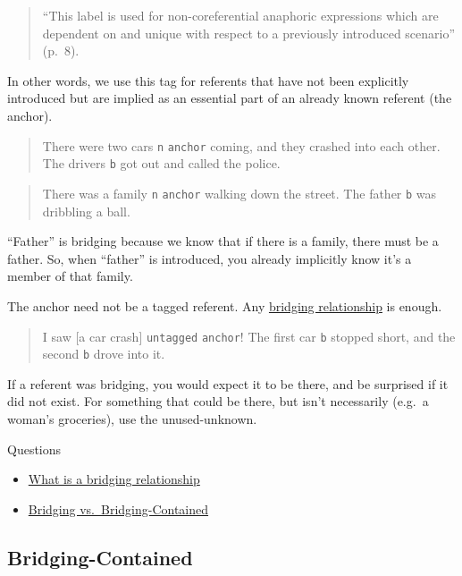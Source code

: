 \documentclass[
]{book}
\providecommand{\tightlist}{%
  \setlength{\itemsep}{0pt}\setlength{\parskip}{0pt}}
\begin{document}
\begin{quote}
``This label is used for non-coreferential anaphoric expressions which are dependent on and unique with respect to a previously introduced scenario'' (p.~8).
\end{quote}

In other words, we use this tag for referents that have not been explicitly introduced but are implied as an essential part of an already known referent (the anchor).

\begin{quote}
There were two cars \texttt{n} \texttt{anchor} coming, and they crashed into each other.
The drivers \texttt{b} got out and called the police.
\end{quote}

\begin{quote}
There was a family \texttt{n} \texttt{anchor} walking down the street.
The father \texttt{b} was dribbling a ball.
\end{quote}

``Father'' is bridging because we know that if there is a family, there must be a father.
So, when ``father'' is introduced, you already implicitly know it's a member of that family.

The anchor need not be a tagged referent.
Any \protect\hyperlink{bridging-relationships}{bridging relationship} is enough.

\begin{quote}
I saw {[}a car crash{]} \texttt{untagged} \texttt{anchor}!
The first car \texttt{b} stopped short, and the second \texttt{b} drove into it.
\end{quote}

If a referent was bridging, you would expect it to be there, and be surprised if it did not exist.
For something that could be there, but isn't necessarily (e.g.~a woman's groceries), use the unused-unknown.

Questions

\begin{itemize}
\tightlist
\item
  \protect\hyperlink{bridging-relationships}{What is a bridging relationship}
\item
  \protect\hyperlink{bridging-vs.-bridging-contained}{Bridging vs.~Bridging-Contained}
\end{itemize}

\hypertarget{bridging-contained}{%
\subsection{Bridging-Contained}\label{bridging-contained}}
\end{document}
